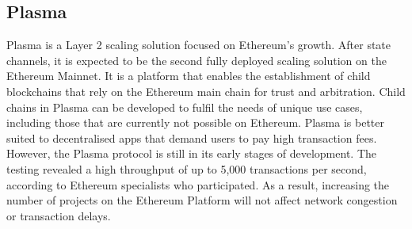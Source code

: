 \subsection{Plasma}
\cite{noauthor_aztec_nodate}
Plasma is a Layer 2 scaling solution focused on Ethereum's growth. After state channels, it is expected to be the second fully deployed scaling solution on the Ethereum Mainnet\cite{sharma_complete_2020}. It is a platform that enables the establishment of child blockchains that rely on the Ethereum main chain for trust and arbitration. Child chains in Plasma can be developed to fulfil the needs of unique use cases, including those that are currently not possible on Ethereum. Plasma is better suited to decentralised apps that demand users to pay high transaction fees. However, the Plasma protocol is still in its early stages of development. The testing revealed a high throughput of up to 5,000 transactions per second, according to Ethereum specialists who participated. As a result, increasing the number of projects on the Ethereum Platform will not affect network congestion or transaction delays.